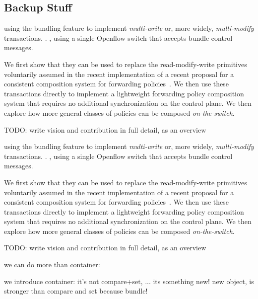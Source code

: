 \documentclass[conference]{sigcomm-alternate}
\begin{document}
{

}

\begin{appendix}

\section{Backup Stuff}

using the bundling feature to implement \emph{multi-write} or, more
widely, \emph{multi-modify} transactions. .
, using a single Openflow switch that accepts
bundle control messages.

We first show that they can be used to replace the read-modify-write
primitives voluntarily assumed in the recent implementation of a
recent proposal for a consistent composition system for forwarding policies~\cite{cpc}.
We then use these transactions directly to implement a lightweight
forwarding policy composition system that requires no additional
synchronization on the control plane.
We then explore how more general classes of policies can be composed
\emph{on-the-switch}.

TODO: write vision and contribution in full detail, as an overview


using the bundling feature to implement \emph{multi-write} or, more
widely, \emph{multi-modify} transactions. .
, using a single Openflow switch that accepts
bundle control messages.

We first show that they can be used to replace the read-modify-write
primitives voluntarily assumed in the recent implementation of a
recent proposal for a consistent composition system for forwarding policies~\cite{cpc}.
We then use these transactions directly to implement a lightweight
forwarding policy composition system that requires no additional
synchronization on the control plane.
We then explore how more general classes of policies can be composed
\emph{on-the-switch}.

TODO: write vision and contribution in full detail, as an overview

we can do more than container:

we introduce container: it's not compare+set, ... its something new!
new object, is stronger than compare and set because bundle!


\end{appendix}
\end{document}
